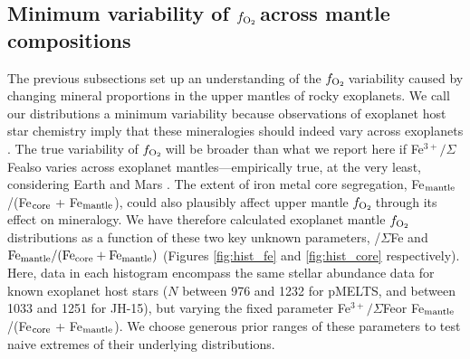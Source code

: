 \documentclass[fleqn,usenatbib,twocolumn]{mnras}
\newcommand{\fo}{$f_{\ce{O2}}$}
\newcommand{\xfer}{Fe$^{3+}/\Sigma$Fe}
\newcommand{\xcore}{Fe$_{\rm mantle}$/(Fe$_{\rm core}$ + Fe$_{\rm mantle}$)}
\newcommand{\todo}[1]{\textit{\textcolor{violet}{{#1}}}}
\begin{document}
\subsection{Minimum variability of \fo\,across mantle compositions}



The previous subsections set up an understanding of the \fo\,variability caused by changing mineral proportions in the upper mantles of rocky exoplanets. We call our distributions a minimum variability because observations of exoplanet host star chemistry imply that these mineralogies should indeed vary across exoplanets \citep{hinkel_stellar_2014, putirka_composition_2019}. The true variability of \fo\,will be broader than what we report here if \xfer\;also varies across exoplanet mantles---empirically true, at the very least,  considering Earth and Mars \citep[e.g.,][]{dale_late_2012}. The extent of iron metal core segregation, \xcore, could also plausibly affect upper mantle \fo\,through its effect on mineralogy. We have therefore calculated exoplanet mantle \fo\,distributions as a function of these two key unknown parameters, /$\Sigma$Fe and ${\rm Fe}_{\rm mantle}/({\rm Fe}_{\rm core} + {\rm Fe}_{\rm mantle})$ (Figures \ref{fig:hist_fe} and \ref{fig:hist_core} respectively). Here, data in each histogram encompass the same stellar abundance data for known exoplanet host stars ($N$ between 976 and 1232 for pMELTS, and between 1033 and 1251 for JH-15), but varying the fixed parameter \xfer\;or \xcore. We choose generous prior ranges of these parameters to test naive extremes of their underlying distributions.




\end{document}
